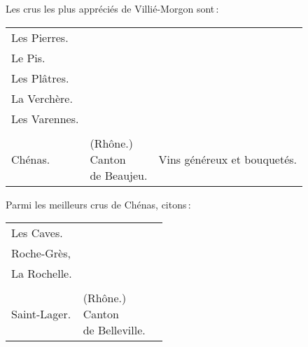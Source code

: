 \medskip
Les crus les plus appréciés de Villié-Morgon sont :

\medskip

\scriptsize
\begin{longtable}{m{12em}m{9em}m{13em}}                                                    
  Les Pierres.                         &                     &                                                        \\
  Le Pis.                              &                     &                                                        \\
  Les Plâtres.                         &                     &                                                        \\
  La Verchère.                         &                     &                                                        \\
  Les Varennes.                        &                     &                                                        \\
                                       &                     &                                                        \\
  Chénas.                              & \makecell{(Rhône.)                                       
                                          \\ Canton                  
                                          \\ de Beaujeu.}    & Vins généreux et bouquetés.                            \\
\end{longtable}                            
\normalsize

\medskip
Parmi les meilleurs crus de Chénas, citons :

\medskip
\scriptsize
\begin{longtable}{m{12em}m{9em}m{13em}}                                                    
  Les Caves.                           &                     &                                                        \\
  Roche-Grès,                          &                     &                                                        \\
  La Rochelle.                         &                     &                                                        \\
                                       &                     &                                                        \\
  Saint-Lager.                         & \makecell{(Rhône.) 
                                         \\ Canton             
                                         \\ de Belleville.}  &                                                        \\
\end{longtable}
\normalsize

